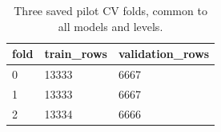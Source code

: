 \begin{table}[htbp]
\centering
\small
\caption{Three saved pilot CV folds, common to all models and levels.}
\label{tab:cv-sizes}
\begin{tabular}{lll}
\toprule
fold & train\_rows & validation\_rows \\
\midrule
0 & 13333 & 6667 \\
1 & 13333 & 6667 \\
2 & 13334 & 6666 \\
\bottomrule
\end{tabular}
\end{table}
